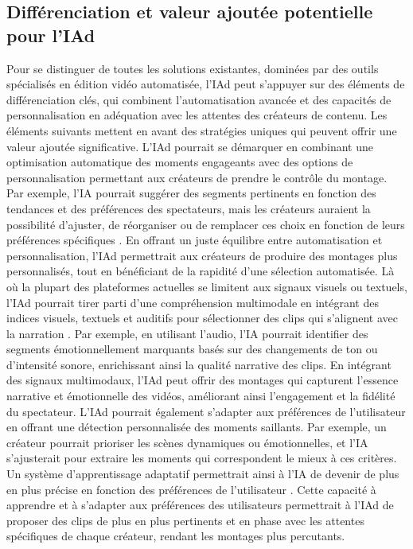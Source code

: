 \documentclass[livre]{udes-genie-these}
\begin{document}
\subsection{Différenciation et valeur ajoutée potentielle pour l'IAd}
Pour se distinguer de toutes les solutions existantes, dominées par des outils spécialisés en édition vidéo automatisée, l'IAd peut s'appuyer sur des éléments de différenciation clés, qui combinent l'automatisation avancée et des capacités de personnalisation en adéquation avec les attentes des créateurs de contenu. Les éléments suivants mettent en avant des stratégies uniques qui peuvent offrir une valeur ajoutée significative.
L'IAd pourrait se démarquer en combinant une optimisation automatique des moments engageants avec des options de personnalisation permettant aux créateurs de prendre le contrôle du montage. Par exemple, l'IA pourrait suggérer des segments pertinents en fonction des tendances et des préférences des spectateurs, mais les créateurs auraient la possibilité d'ajuster, de réorganiser ou de remplacer ces choix en fonction de leurs préférences spécifiques \cite{descript2024}\cite{captions2024}\cite{short2024}\cite{ssemble2024}. En offrant un juste équilibre entre automatisation et personnalisation, l'IAd permettrait aux créateurs de produire des montages plus personnalisés, tout en bénéficiant de la rapidité d'une sélection automatisée.
Là où la plupart des plateformes actuelles se limitent aux signaux visuels ou textuels, l'IAd pourrait tirer parti d'une compréhension multimodale en intégrant des indices visuels, textuels et auditifs pour sélectionner des clips qui s'alignent avec la narration \cite{descript2024}\cite{powder2024}\cite{framedrop2024}. Par exemple, en utilisant l'audio, l'IA pourrait identifier des segments émotionnellement marquants basés sur des changements de ton ou d'intensité sonore, enrichissant ainsi la qualité narrative des clips. En intégrant des signaux multimodaux, l'IAd peut offrir des montages qui capturent l'essence narrative et émotionnelle des vidéos, améliorant ainsi l'engagement et la fidélité du spectateur.
L'IAd pourrait également s'adapter aux préférences de l'utilisateur en offrant une détection personnalisée des moments saillants. Par exemple, un créateur pourrait prioriser les scènes dynamiques ou émotionnelles, et l'IA s'ajusterait pour extraire les moments qui correspondent le mieux à ces critères. Un système d'apprentissage adaptatif permettrait ainsi à l'IA de devenir de plus en plus précise en fonction des préférences de l'utilisateur \cite{short2024}\cite{ssemble2024}\cite{munch2024}\cite{klap2024}. Cette capacité à apprendre et à s'adapter aux préférences des utilisateurs permettrait à l'IAd de proposer des clips de plus en plus pertinents et en phase avec les attentes spécifiques de chaque créateur, rendant les montages plus percutants.
\end{document}
